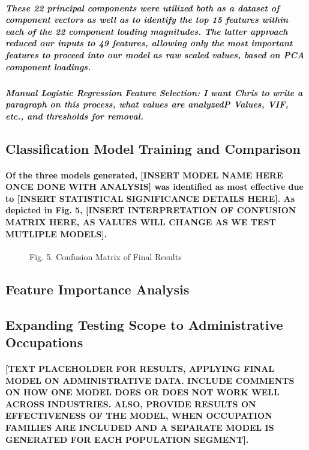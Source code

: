 \documentclass{article}
\begin{document}
\subparagraph{These 22 principal components were utilized both as a dataset of component vectors as well as to identify the top 15 features within each of the 22 component loading magnitudes. The latter approach reduced our inputs to 49 features, allowing only the most important features to proceed into our model as raw scaled values, based on PCA component loadings.}

\subparagraph{Manual Logistic Regression Feature Selection: I want Chris to write a paragraph on this process, what values are analyzed{P Values, VIF, etc.}, and thresholds for removal.}
 

\subsection{Classification Model Training and Comparison}

\paragraph{Of the three models generated, [INSERT MODEL NAME HERE ONCE DONE WITH ANALYSIS] was identified as most effective due to [INSERT STATISTICAL SIGNIFICANCE DETAILS HERE]. As depicted in Fig. 5, [INSERT INTERPRETATION OF CONFUSION MATRIX HERE, AS VALUES WILL CHANGE AS WE TEST MUTLIPLE MODELS].}
 
\begin{figure}
\caption{Fig. 5. Confusion Matrix of Final Results}
\end{figure}

\subsection{Feature Importance Analysis}

\subsection{Expanding Testing Scope to Administrative Occupations}

\paragraph{[TEXT PLACEHOLDER FOR RESULTS, APPLYING FINAL MODEL ON ADMINISTRATIVE DATA. INCLUDE COMMENTS ON HOW ONE MODEL DOES OR DOES NOT WORK WELL ACROSS INDUSTRIES. ALSO, PROVIDE RESULTS ON EFFECTIVENESS OF THE MODEL, WHEN OCCUPATION FAMILIES ARE INCLUDED AND A SEPARATE MODEL IS GENERATED FOR EACH POPULATION SEGMENT].}
\end{document}

